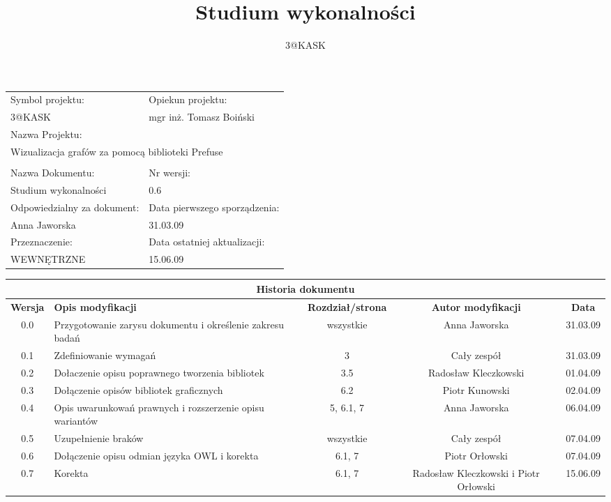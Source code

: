 \documentclass[a4paper,10pt]{article}
\title{Studium wykonalności}
\author{3@KASK}
\begin{document}



\maketitle


\begin{center}
\begin{tabular}{|p{7cm}|p{7cm}|}
\hline
Symbol projektu: & Opiekun projektu:   \tabularnewline
3@KASK & mgr inż. Tomasz Boiński    \tabularnewline \hline
\multicolumn{2}{|l|}{Nazwa Projektu: } \tabularnewline
\multicolumn{2}{|l|}{Wizualizacja grafów za pomocą biblioteki Prefuse } \tabularnewline
\hline
\multicolumn{2}{l}{ } \tabularnewline %
\hline
Nazwa Dokumentu: & Nr wersji:   \tabularnewline
Studium wykonalności & 0.6 \tabularnewline \hline
Odpowiedzialny za dokument: & Data pierwszego sporządzenia:   \tabularnewline
Anna Jaworska & 31.03.09 \tabularnewline \hline
Przeznaczenie: & Data ostatniej aktualizacji:   \tabularnewline
WEWNĘTRZNE & 15.06.09 \tabularnewline \hline
\end{tabular}
\end{center}

\begin{center}
\begin{tabular}{|c|p{4cm}|c|c|c|}
\multicolumn{5}{c}{\textbf{Historia dokumentu}} \tabularnewline \hline
\textbf{Wersja} & \textbf{Opis modyfikacji} & \textbf{Rozdział/strona} & \textbf{Autor modyfikacji} & \textbf{Data} \tabularnewline \hline
0.0 & Przygotowanie zarysu dokumentu i określenie zakresu badań & wszystkie & Anna Jaworska & 31.03.09 \tabularnewline \hline
0.1 & Zdefiniowanie wymagań  & 3 & Cały zespół & 31.03.09  \tabularnewline \hline
0.2 & Dołaczenie opisu poprawnego tworzenia bibliotek & 3.5 & Radosław Kleczkowski & 01.04.09\tabularnewline \hline
0.3 & Dołączenie opisów bibliotek graficznych  & 6.2 & Piotr Kunowski & 02.04.09 \tabularnewline \hline
0.4 & Opis uwarunkowań prawnych i rozszerzenie opisu wariantów & 5, 6.1, 7 & Anna Jaworska & 06.04.09\tabularnewline \hline
0.5 & Uzupełnienie braków & wszystkie  & Cały zespół & 07.04.09 \tabularnewline \hline
0.6 & Dołączenie opisu odmian języka OWL i korekta & 6.1, 7  & Piotr Orłowski & 07.04.09 \tabularnewline \hline
0.7 & Korekta & 6.1, 7  & Radosław Kleczkowski i Piotr Orłowski & 15.06.09 \tabularnewline \hline
\end{tabular}


\end{center}
\end{document}
